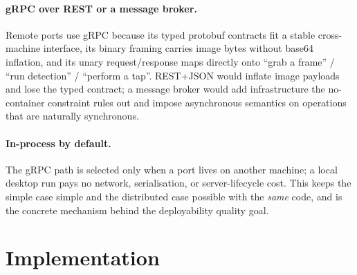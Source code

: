 \documentclass[11pt,a4paper]{article}
\begin{document}
\paragraph{gRPC over REST or a message broker.} Remote ports use gRPC because its
typed protobuf contracts fit a stable cross-machine interface, its binary framing
carries image bytes without base64 inflation, and its unary request/response maps
directly onto ``grab a frame'' / ``run detection'' / ``perform a tap''. REST+JSON
would inflate image payloads and lose the typed contract; a message broker would add
infrastructure the no-container constraint rules out and impose asynchronous
semantics on operations that are naturally synchronous.

\paragraph{In-process by default.} The gRPC path is selected only when a port lives
on another machine; a local desktop run pays no network, serialisation, or
server-lifecycle cost. This keeps the simple case simple and the distributed case
possible with the \emph{same} code, and is the concrete mechanism behind the
deployability quality goal.

\section{Implementation}
\label{sec:impl}
\end{document}
